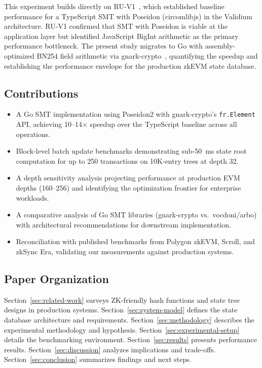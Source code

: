 This experiment builds directly on RU-V1~\cite{basis2026ruv1}, which
established baseline performance for a TypeScript SMT with Poseidon
(circomlibjs) in the Validium architecture. RU-V1 confirmed that SMT
with Poseidon is viable at the application layer but identified
JavaScript BigInt arithmetic as the primary performance bottleneck.
The present study migrates to Go with assembly-optimized BN254 field
arithmetic via gnark-crypto~\cite{gnark2024crypto}, quantifying the
speedup and establishing the performance envelope for the production
zkEVM state database.

\subsection{Contributions}

\begin{itemize}
  \item A Go SMT implementation using Poseidon2 with gnark-crypto's
    \texttt{fr.Element} API, achieving 10--14$\times$ speedup over
    the TypeScript baseline across all operations.
  \item Block-level batch update benchmarks demonstrating sub-50~ms
    state root computation for up to 250 transactions on 10K-entry
    trees at depth 32.
  \item A depth sensitivity analysis projecting performance at
    production EVM depths (160--256) and identifying the optimization
    frontier for enterprise workloads.
  \item A comparative analysis of Go SMT libraries (gnark-crypto
    vs.\ vocdoni/arbo) with architectural recommendations for
    downstream implementation.
  \item Reconciliation with published benchmarks from Polygon zkEVM,
    Scroll, and zkSync Era, validating our measurements against
    production systems.
\end{itemize}

\subsection{Paper Organization}

Section~\ref{sec:related-work} surveys ZK-friendly hash functions and
state tree designs in production systems.
Section~\ref{sec:system-model} defines the state database architecture
and requirements. Section~\ref{sec:methodology} describes the
experimental methodology and hypothesis.
Section~\ref{sec:experimental-setup} details the benchmarking
environment. Section~\ref{sec:results} presents performance results.
Section~\ref{sec:discussion} analyzes implications and trade-offs.
Section~\ref{sec:conclusion} summarizes findings and next steps.
